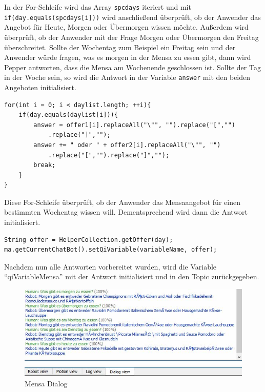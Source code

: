 In der For-Schleife wird das Array \verb|spcdays| iteriert und mit \verb|if(day.equals(spcdays[i]))| wird anschließend überprüft, ob der Anwender das Angebot für Heute, Morgen oder Übermorgen wissen möchte. Außerdem wird 
überprüft, ob der Anwender mit der Frage Morgen oder Übermorgen den Freitag überschreitet. Sollte der Wochentag zum Beispiel ein Freitag 
sein und der Anwender würde fragen, was es morgen in der Mensa zu essen gibt, dann wird Pepper antworten, dass die Mensa am Wochenende geschlossen 
ist. Sollte der Tag in der Woche sein, so wird die Antwort in der Variable \verb|answer| mit den beiden Angeboten initialisiert. \\

\begin{lstlisting}
for(int i = 0; i < daylist.length; ++i){
    if(day.equals(daylist[i])){
        answer = offer1[i].replaceAll("\"", "").replace("[","")
            .replace("]","");
        answer += " oder " + offer2[i].replaceAll("\"", "")
            .replace("[","").replace("]","");
        break;
    }
}
\end{lstlisting}

Diese For-Schleife überprüft, ob der Anwender das Mensaangebot für einen bestimmten Wochentag wissen will. Dementsprechend wird dann die 
Antwort initialisiert.\\

\begin{lstlisting}
String offer = HelperCollection.getOffer(day);
ma.getCurrentChatBot().setQiVariable(variableName, offer);    
\end{lstlisting}

Nachdem nun alle Antworten vorbereitet wurden, wird die Variable “qiVariableMensa” mit der Antwort initialisiert und in den Topic 
zurückgegeben. \\

\begin{figure}[H]
    \centering
    \includegraphics[width=\textwidth]{Figures/AppChapter/mensa_6.JPG}
    \caption{Mensa Dialog}
    \label{fig:mensadialog}
    \centering
\end{figure}



